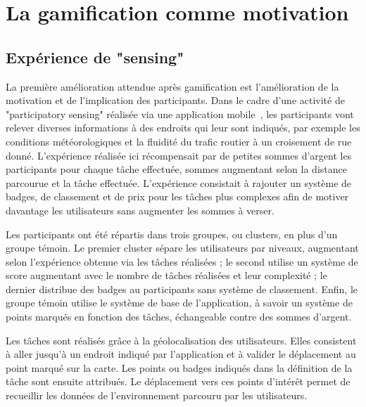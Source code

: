 \section{La gamification comme motivation}
\subsection{Expérience de "sensing"}
La première amélioration attendue après gamification est l'amélioration de la motivation et de l'implication des participants. Dans le cadre d'une activité de "participatory sensing" réalisée via une application mobile~\cite{gamif-partici},  les participants vont relever diverses informations à des endroits qui leur sont indiqués, par exemple les conditions météorologiques et la fluidité du trafic routier à un croisement de rue donné. L'expérience réalisée ici récompensait par de petites sommes d'argent les participants pour chaque tâche effectuée, sommes augmentant selon la distance parcourue et la tâche effectuée. L'expérience consistait à rajouter un système de badges, de classement et de prix pour les tâches plus complexes afin de motiver davantage les utilisateurs sans augmenter les sommes à verser.\par
Les participants ont été répartis dans trois groupes, ou clusters, en plus d'un groupe témoin. Le premier cluster sépare les utilisateurs par niveaux, augmentant selon l'expérience obtenue via les tâches réalisées ; le second utilise un système de score augmentant avec le nombre de tâches réalisées et leur complexité ; le dernier distribue des badges au participants sans système de classement. Enfin, le groupe témoin utilise le système de base de l'application, à savoir un système de points marqués en fonction des tâches, échangeable contre des sommes d'argent. \par 
Les tâches sont réalisés grâce à la géolocalisation des utilisateurs. Elles consistent à aller jusqu’à un endroit indiqué par l’application et à valider  le déplacement au point marqué sur la carte. Les points ou badges indiqués dans la définition de la tâche sont ensuite attribués. Le déplacement vers ces points d’intérêt permet de recueillir les données de l’environnement parcouru par les utilisateurs.


